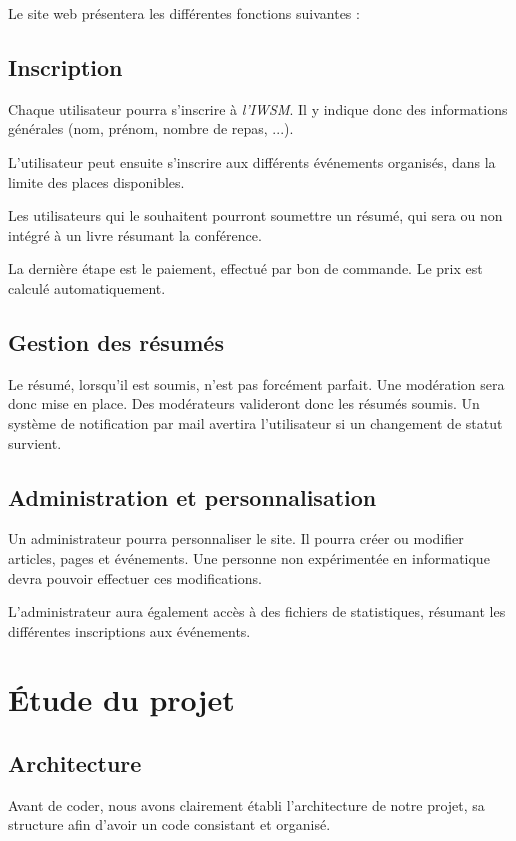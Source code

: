 \documentclass[a4paper,11pt]{article}
\begin{document}
Le site web présentera les différentes fonctions suivantes : 

\subsection*{Inscription}

Chaque utilisateur pourra s'inscrire à \textit{l'IWSM}. Il y indique donc des informations générales (nom, prénom, nombre de repas, ...). 

L'utilisateur peut ensuite s'inscrire aux différents événements organisés, dans la limite des places disponibles. 

Les utilisateurs qui le souhaitent pourront soumettre un résumé, qui sera ou non intégré à un livre résumant la conférence. 

La dernière étape est le paiement, effectué par bon de commande. Le prix est calculé automatiquement. 
\subsection*{Gestion des résumés}

Le résumé, lorsqu'il est soumis, n'est pas forcément parfait. Une modération sera donc mise en place. Des modérateurs valideront donc les résumés soumis. Un système de notification par mail avertira l'utilisateur si un changement de statut survient. 

\subsection*{Administration et personnalisation}

Un administrateur pourra personnaliser le site. Il pourra créer ou modifier articles, pages et événements. Une personne non expérimentée en informatique devra pouvoir effectuer ces modifications.

\smallbreak

L'administrateur aura également accès à des fichiers de statistiques, résumant les différentes inscriptions aux événements. 

\section{Étude du projet}
\subsection{Architecture}

Avant de coder, nous avons clairement établi l'architecture de notre projet, sa structure afin d'avoir un code consistant et organisé.
\end{document}
